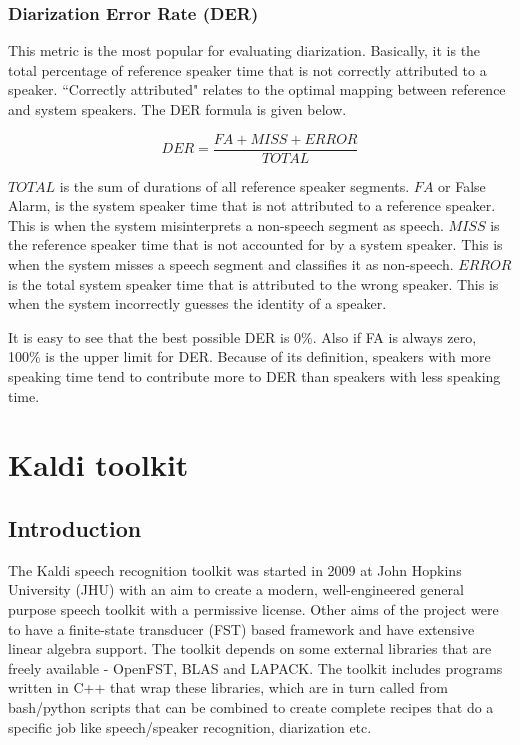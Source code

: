 	\subsubsection{Diarization Error Rate (DER)}
		This metric is the most popular for evaluating diarization. Basically, it is the total percentage of reference speaker time that is not correctly attributed to a speaker. ``Correctly attributed" relates to the optimal mapping between reference and system speakers. The DER formula is given below.
		
		$$ DER = \frac{FA + MISS + ERROR}{TOTAL} $$
		
		$TOTAL$ is the sum of durations of all reference speaker segments.
		$FA$ or False Alarm, is the system speaker time that is not attributed to a reference speaker. This is when the system misinterprets a non-speech segment as speech.
		$MISS$ is the reference speaker time that is not accounted for by a system speaker. This is when the system misses a speech segment and classifies it as non-speech.
		$ERROR$ is the total system speaker time that is attributed to the wrong speaker. This is when the system incorrectly guesses the identity of a speaker.
		
		It is easy to see that the best possible DER is 0\%. Also if FA is always zero, 100\% is the upper limit for DER. Because of its definition, speakers with more speaking time tend to contribute more to DER than speakers with less speaking time.

\section{Kaldi toolkit}
	\subsection{Introduction}
	The Kaldi speech recognition toolkit \cite{povey2011kaldi} was started in 2009 at John Hopkins University (JHU) with an aim to create a modern, well-engineered general purpose speech toolkit with a permissive license. Other aims of the project were to have a finite-state transducer (FST) based framework and have extensive linear algebra support. The toolkit depends on some external libraries that are freely available - OpenFST, BLAS and LAPACK. The toolkit includes programs written in C++ that wrap these libraries, which are in turn called from bash/python scripts that can be combined to create complete recipes that do a specific job like speech/speaker recognition, diarization etc.
	
